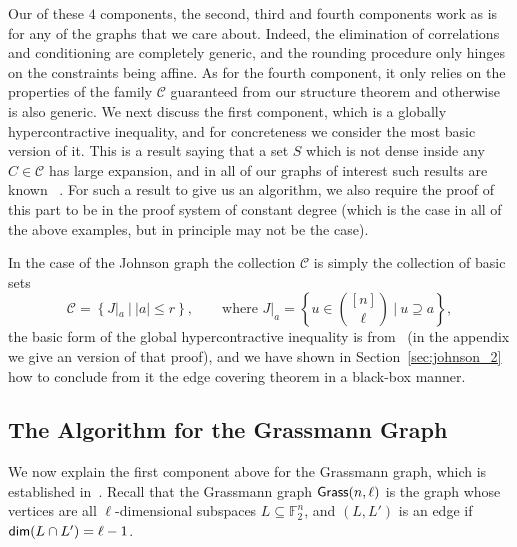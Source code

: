 Our of these $4$ components, the second, third and 
fourth components work as is for any of the graphs that we 
care about. Indeed, the elimination of correlations and 
conditioning are completely generic, and the rounding 
procedure only hinges on the constraints being affine. 
As for the fourth component, it only relies on the properties
of the family $\mathcal{C}$ guaranteed from our structure 
theorem and otherwise is also generic.
\skipi
We next discuss the first component, which is a globally 
hypercontractive inequality, and for concreteness we 
consider the most basic version of it. This is a result
saying that a set $S$ which is not dense inside any 
$C\in \mathcal{C}$ has large expansion, and in 
all of our graphs of interest such results are known
~\cite{KMMS,KhotMS18,filmus2020hypercontractivity,keevash2021global,bafna2022hypercontractivity,gur2022hypercontractivity}. 
For such a result to give us an algorithm, we also require 
the proof of this part to be in the \sos proof system of
constant degree (which is the case in all of the above
examples, but in principle may not be the case). 

In the case of the Johnson graph the collection 
$\mathcal{C}$ is simply the collection of basic sets 
\[
\mathcal{C} = \left\{J|_a ~|~|a|\leq r\right\},
\qquad
\text{where }
J|_a = \left\{u\in\binom{[n]}{\ell}~\Big|~u\supseteq a\right\},
\]
the basic form of the global hypercontractive inequality is 
from~\cite{KMMS} (in the appendix we give an \sos version of 
that proof), and we have shown in Section~\ref{sec:johnson_2} how to conclude from it the edge covering theorem in a black-box manner.

\subsection{The Algorithm for the Grassmann Graph}
We now explain the first component above 
for the Grassmann graph, which is established in~\cite{KhotMS18}. Recall that the Grassmann graph 
${\sf Grass}(n,\ell)$ is the graph whose vertices are all
$\ell$-dimensional subspaces $L\subseteq \mathbb{F}_2^n$, 
and $(L,L')$ is an edge if ${\sf dim}(L\cap L') = \ell-1$.


